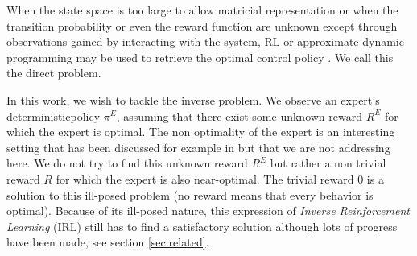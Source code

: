 \documentclass[smallextended]{svjour3}
\begin{document}
When the state space is too large to allow matricial representation or when the transition probability or even the reward function are unknown except through observations gained by interacting with the system, RL or approximate dynamic programming may be used to retrieve the optimal control policy \cite{sutton1998reinforcement}. We call this the direct problem.

In this work, we wish to tackle the inverse problem. We observe an expert's deterministic\footnotemark[\value{footnote}] policy $\pi^E$, assuming that there exist some unknown reward $R^E$ for which the expert is optimal. The non optimality of the expert is an interesting setting that has been discussed for example in \cite{melo2012analysis} but that we are not addressing here. We do not try to find this unknown reward $R^E$ but rather a non trivial reward $R$ for which the expert is also near-optimal. The trivial reward $0$ is a solution to this ill-posed problem (no reward means that every behavior is optimal). Because of its ill-posed nature, this expression of \emph{Inverse Reinforcement Learning} (IRL) still has to find a satisfactory solution although lots of progress have been made, see section \ref{sec:related}.
\end{document}
